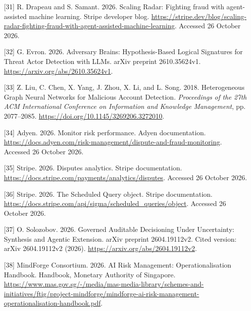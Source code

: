 \documentclass[acmlarge,nonacm]{acmart}
\newlength{\cslhangindent}
\newlength{\cslentryspacingunit} %
\newenvironment{CSLReferences}[2] %
 {\bibliofont %
  \setlength{\parindent}{0pt}
  \ifodd #1
  \let\oldpar\par
  \def\par{\hangindent=\cslhangindent\oldpar}
  \fi
  \setlength{\parskip}{#2\cslentryspacingunit}
 }%
 {}
\begin{document}
\begin{CSLReferences}{1}{1}
\leavevmode{}%
{[}31{]} R. Drapeau and S. Samant. 2026. Scaling Radar: Fighting fraud
with agent-assisted machine learning. Stripe developer blog.
\url{https://stripe.dev/blog/scaling-radar-fighting-fraud-with-agent-assisted-machine-learning}.
Accessed 26 October 2026.

\leavevmode{}%
{[}32{]} G. Evron. 2026. Adversary Brains: Hypothesis-Based Logical
Signatures for Threat Actor Detection with LLMs. arXiv preprint
2610.35624v1. \url{https://arxiv.org/abs/2610.35624v1}.

\leavevmode{}%
{[}33{]} Z. Liu, C. Chen, X. Yang, J. Zhou, X. Li, and L. Song. 2018.
Heterogeneous Graph Neural Networks for Malicious Account Detection.
\emph{Proceedings of the 27th ACM International Conference on
Information and Knowledge Management}, pp. 2077--2085.
\url{https://doi.org/10.1145/3269206.3272010}.

\leavevmode{}%
{[}34{]} Adyen. 2026. Monitor risk performance. Adyen documentation.
\url{https://docs.adyen.com/risk-management/dispute-and-fraud-monitoring}.
Accessed 26 October 2026.

\leavevmode{}%
{[}35{]} Stripe. 2026. Disputes analytics. Stripe documentation.
\url{https://docs.stripe.com/payments/analytics/disputes}. Accessed 26
October 2026.

\leavevmode{}%
{[}36{]} Stripe. 2026. The Scheduled Query object. Stripe documentation.
\url{https://docs.stripe.com/api/sigma/scheduled_queries/object}.
Accessed 26 October 2026.

\leavevmode{}%
{[}37{]} O. Solozobov. 2026. Governed Auditable Decisioning Under
Uncertainty: Synthesis and Agentic Extension. arXiv preprint
2604.19112v2. Cited version: arXiv 2604.19112v2 (2026).
\url{https://arxiv.org/abs/2604.19112v2}.

\leavevmode{}%
{[}38{]} MindForge Consortium. 2026. AI Risk Management:
Operationalisation Handbook. Handbook, Monetary Authority of Singapore.
\url{https://www.mas.gov.sg/-/media/mas-media-library/schemes-and-initiatives/ftig/project-mindforge/mindforge-ai-risk-management-operationalisation-handbook.pdf}.


\end{CSLReferences}
\end{document}
